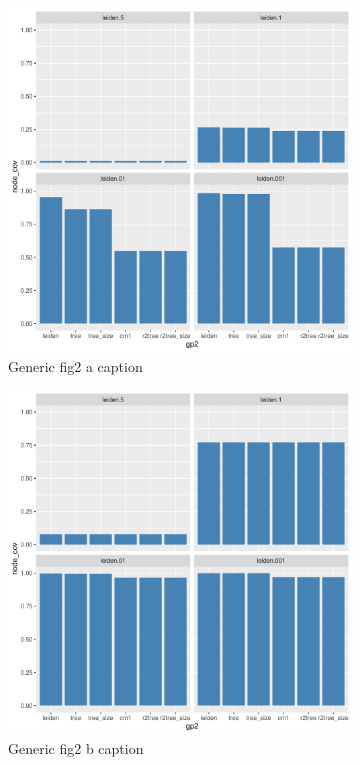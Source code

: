 \documentclass[12pt, oneside]{article}   	%
\begin{document}
	
\begin{figure}[H]
\centering
\begin{subfigure}[t]{0.48\textwidth}
\centering
\includegraphics[width=0.9\linewidth]{cit_patents.pdf}
\caption{Generic fig2 a caption} \label{fig:2a}
\end{subfigure}
\hfill
\begin{subfigure}[t]{0.48\textwidth}
\centering
\includegraphics[width=0.9\linewidth]{lfr_wtp_0.5.pdf} 
\caption{Generic fig2 b caption} \label{fig:2a}
\end{subfigure}
\caption{}
\label{fig:overlapping}
\end{figure}
		
\end{document}
